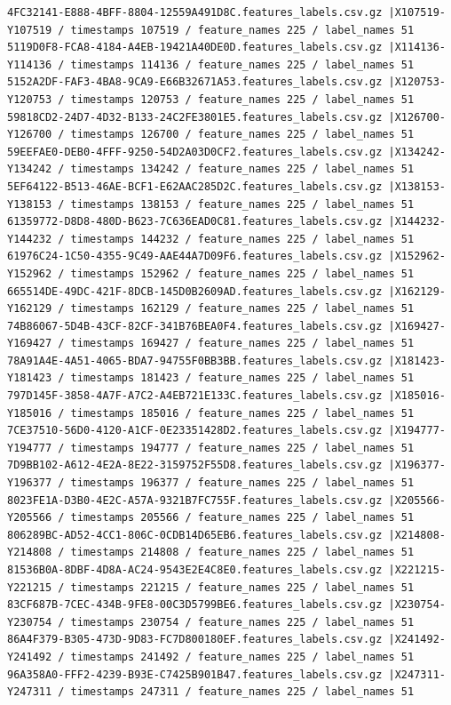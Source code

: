 \documentclass{UoNMCHA}
\numberwithin{equation}{section}
\begin{document}
\begin{lstlisting}[breaklines=true]
4FC32141-E888-4BFF-8804-12559A491D8C.features_labels.csv.gz |X107519-Y107519 / timestamps 107519 / feature_names 225 / label_names 51
5119D0F8-FCA8-4184-A4EB-19421A40DE0D.features_labels.csv.gz |X114136-Y114136 / timestamps 114136 / feature_names 225 / label_names 51
5152A2DF-FAF3-4BA8-9CA9-E66B32671A53.features_labels.csv.gz |X120753-Y120753 / timestamps 120753 / feature_names 225 / label_names 51
59818CD2-24D7-4D32-B133-24C2FE3801E5.features_labels.csv.gz |X126700-Y126700 / timestamps 126700 / feature_names 225 / label_names 51
59EEFAE0-DEB0-4FFF-9250-54D2A03D0CF2.features_labels.csv.gz |X134242-Y134242 / timestamps 134242 / feature_names 225 / label_names 51
5EF64122-B513-46AE-BCF1-E62AAC285D2C.features_labels.csv.gz |X138153-Y138153 / timestamps 138153 / feature_names 225 / label_names 51
61359772-D8D8-480D-B623-7C636EAD0C81.features_labels.csv.gz |X144232-Y144232 / timestamps 144232 / feature_names 225 / label_names 51
61976C24-1C50-4355-9C49-AAE44A7D09F6.features_labels.csv.gz |X152962-Y152962 / timestamps 152962 / feature_names 225 / label_names 51
665514DE-49DC-421F-8DCB-145D0B2609AD.features_labels.csv.gz |X162129-Y162129 / timestamps 162129 / feature_names 225 / label_names 51
74B86067-5D4B-43CF-82CF-341B76BEA0F4.features_labels.csv.gz |X169427-Y169427 / timestamps 169427 / feature_names 225 / label_names 51
78A91A4E-4A51-4065-BDA7-94755F0BB3BB.features_labels.csv.gz |X181423-Y181423 / timestamps 181423 / feature_names 225 / label_names 51
797D145F-3858-4A7F-A7C2-A4EB721E133C.features_labels.csv.gz |X185016-Y185016 / timestamps 185016 / feature_names 225 / label_names 51
7CE37510-56D0-4120-A1CF-0E23351428D2.features_labels.csv.gz |X194777-Y194777 / timestamps 194777 / feature_names 225 / label_names 51
7D9BB102-A612-4E2A-8E22-3159752F55D8.features_labels.csv.gz |X196377-Y196377 / timestamps 196377 / feature_names 225 / label_names 51
8023FE1A-D3B0-4E2C-A57A-9321B7FC755F.features_labels.csv.gz |X205566-Y205566 / timestamps 205566 / feature_names 225 / label_names 51
806289BC-AD52-4CC1-806C-0CDB14D65EB6.features_labels.csv.gz |X214808-Y214808 / timestamps 214808 / feature_names 225 / label_names 51
81536B0A-8DBF-4D8A-AC24-9543E2E4C8E0.features_labels.csv.gz |X221215-Y221215 / timestamps 221215 / feature_names 225 / label_names 51
83CF687B-7CEC-434B-9FE8-00C3D5799BE6.features_labels.csv.gz |X230754-Y230754 / timestamps 230754 / feature_names 225 / label_names 51
86A4F379-B305-473D-9D83-FC7D800180EF.features_labels.csv.gz |X241492-Y241492 / timestamps 241492 / feature_names 225 / label_names 51
96A358A0-FFF2-4239-B93E-C7425B901B47.features_labels.csv.gz |X247311-Y247311 / timestamps 247311 / feature_names 225 / label_names 51

\end{lstlisting}
\end{document}
